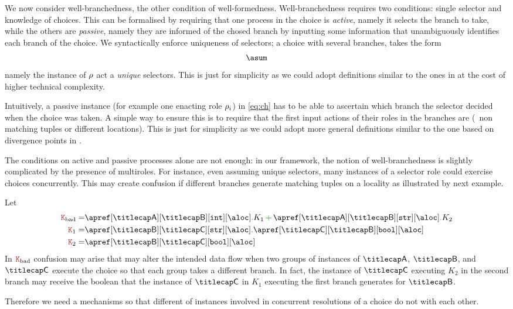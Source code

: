 We now consider well-branchedness, the other condition of
well-formedness.
%
Well-branchedness requires two conditions: single selector and knowledge of 
choices.
%
This can be formalised by requiring that one process in the choice is
\emph{active}, namely it selects the branch to take, while the others
are \emph{passive}, namely they are informed of the chosed branch by
inputting some information that unambiguously identifies each branch
of the choice.
%
%
We syntactically enforce uniqueness of selectors; a choice with
several branches, takes the form
\begin{align}
  \asum\label{eq:ch}
\end{align}
namely the instance of $\rho$ act a \emph{unique} selectors.
%
This is just for simplicity as we could adopt definitions similar to
the ones in \cite{gt16,gt17} at the cost of higher technical
complexity.

Intuitively, a passive instance (for example one enacting role
$\rho_i$) in \eqref{eq:ch} has to be able to ascertain which branch
the selector decided when the choice was taken.
%
A simple way to ensure this is to require that the first input actions
of their roles in the branches are  (\ie\ non matching
tuples or different locations).
%
This is just for simplicity as we could adopt more general definitions
similar to the one based on divergence points in \cite{gt16,gt17}.

The conditions on active and passive processes alone are not enough:
in our framework, the notion of well-branchedness is slightly
complicated by the presence of multiroles.
%
For instance, even assuming unique selectors, many instances of a
selector role could exercise choices concurrently.
%
This may create confusion if different branches generate matching
tuples on a locality as illustrated by next example.
\begin{example}\label{ex:nonwb}
  Let
  \begin{align*}
    \aK_\mathrm{bad} = & \apref[\amulti A][\amulti B][{\asort[int]}][\aloc] \mkop{.} K_1 \chop \apref[\amulti A][\amulti B][{\asort[str]}][\aloc] \mkop{.} K_2
    \\
    \aK_1 = & \apref[\amulti B][\amulti C][{\asort[str]}][\aloc] \mkop{.} \apref[\amulti C][\amulti B][{\asort[bool]}][\aloc]
    \\
    \aK_2 = & \apref[\amulti B][\amulti C][{\asort[bool]}][\aloc]
  \end{align*}
  In $\aK_\mathrm{bad}$ confusion may arise that may alter the
  intended data flow when two groups of instances of $\amulti A$,
  $\amulti B$, and $\amulti C$ execute the choice so that each group
  takes a different branch.
  In fact, the instance of $\amulti C$ executing $K_2$ in the second
  branch may receive the boolean that the instance of $\amulti C$ in
  $K_1$ executing the first branch generates for $\amulti B$.
  \finex
\end{example}
%
Therefore we need a mechanisms so that different  of
instances involved in concurrent resolutions of a choice do not
 with each other.

